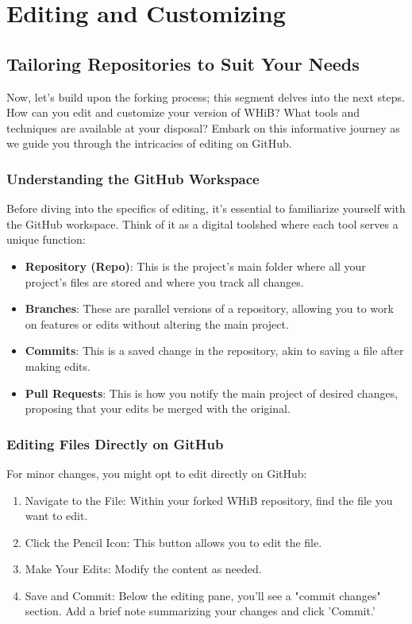 \documentclass[a4paper,12pt]{book}
\begin{document}
\chapter{Editing and Customizing}
\section*{Tailoring Repositories to Suit Your Needs}
Now, let's build upon the forking process; this segment delves into the next steps. How can you edit and customize your version of WHiB? What tools and techniques are available at your disposal? Embark on this informative journey as we guide you through the intricacies of editing on GitHub.

\subsection*{Understanding the GitHub Workspace}
Before diving into the specifics of editing, it's essential to familiarize yourself with the GitHub workspace. Think of it as a digital toolshed where each tool serves a unique function:

\begin{itemize}
    \item \textbf{Repository (Repo)}: This is the project's main folder where all your project's files are stored and where you track all changes.
    \item \textbf{Branches}: These are parallel versions of a repository, allowing you to work on features or edits without altering the main project.
    \item \textbf{Commits}: This is a saved change in the repository, akin to saving a file after making edits.
    \item \textbf{Pull Requests}: This is how you notify the main project of desired changes, proposing that your edits be merged with the original.
\end{itemize}

\subsection*{Editing Files Directly on GitHub}
For minor changes, you might opt to edit directly on GitHub:

\begin{enumerate}
    \item Navigate to the File: Within your forked WHiB repository, find the file you want to edit.
    \item Click the Pencil Icon: This button allows you to edit the file.
    \item Make Your Edits: Modify the content as needed.
    \item Save and Commit: Below the editing pane, you'll see a "commit changes" section. Add a brief note summarizing your changes and click 'Commit.'
\end{enumerate}
\end{document}
